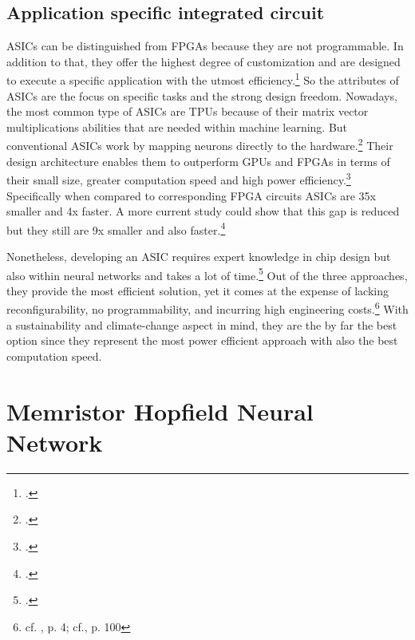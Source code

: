 \subsection{Application specific integrated circuit}
\ac{ASIC}s can be distinguished from \ac{FPGA}s because they are not programmable. 
In addition to that, they offer the highest degree of customization and are designed to execute a specific application with the utmost efficiency.\footcite[cf.][17]{baischerLearningHardwareTutorial2021}
So the attributes of \ac{ASIC}s are the focus on specific tasks and the strong design freedom.
Nowadays, the most common type of \ac{ASIC}s are \ac{TPU}s because of their matrix vector multiplications abilities that are needed within machine learning. But conventional \ac{ASIC}s work by mapping neurons directly to the hardware.\footcite[cf.][104]{huSurveyConvolutionalNeural2022}
Their design architecture enables them to outperform \ac{GPU}s and \ac{FPGA}s in terms of their small size, greater computation speed and high power efficiency.\footcite[cf.][17]{baischerLearningHardwareTutorial2021}
Specifically when compared to corresponding \ac{FPGA} circuits  \ac{ASIC}s are 35x smaller and 4x faster. 
A more current study could show that this gap is reduced but they still are 9x smaller and also faster.\footcite[cf.][5]{boutrosFPGAArchitecturePrinciples2021}

Nonetheless, developing an \ac{ASIC} requires expert knowledge in chip design but also within neural networks and takes a lot of time.\footcite[cf.][17]{baischerLearningHardwareTutorial2021}
Out of the three approaches, they provide the most efficient solution, yet it comes at the expense of lacking reconfigurability, no programmability, and incurring high engineering costs.\footnote{cf. \cite{peccerilloSurveyHardwareAccelerators2022}, p. 4; cf.\cite{huSurveyConvolutionalNeural2022}, p. 100}
With a sustainability and climate-change aspect in mind, they are the by far the best option since they represent the most power efficient approach with also the best computation speed.


\section{Memristor Hopfield Neural Network}

